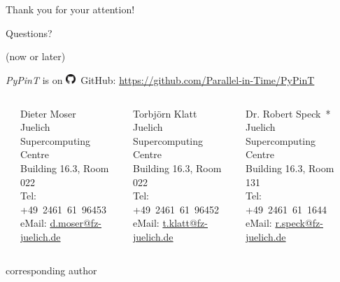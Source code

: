 \documentclass[%
  english,
  hyperref={pdfpagelabels=false},
  aspectratio=1610]{beamer}
\begin{document}
\begin{frame}
  \frametitle{~}
  \begin{center}
    {\huge Thank you for your attention!}\par
    \bigskip
    \bigskip
    \bigskip
    {\Large Questions?}\par
    {\scriptsize\color{fzjgray50}(now or later)}\par
    \bigskip
    {\scriptsize \emph{PyPinT} is on \includegraphics[height=1em]{src/GitHub-Mark-32px.png}~GitHub: \url{https://github.com/Parallel-in-Time/PyPinT}}
    \bigskip
    \begin{columns}
      \tiny
      \begin{column}{0.09\textwidth}
      \end{column}
      \begin{column}{0.3\textwidth}
        Dieter Moser\\
        Juelich Supercomputing Centre\\
        Building 16.3, Room 022\\
        Tel: +49~2461~61~96453\\
        eMail: \href{mailto:d.moser@fz-juelich.de}{d.moser@fz-juelich.de}
      \end{column}
      \begin{column}{0.3\textwidth}
        Torbjörn Klatt\\
        Juelich Supercomputing Centre\\
        Building 16.3, Room 022\\
        Tel: +49~2461~61~96452\\
        eMail: \href{mailto:t.klatt@fz-juelich.de}{t.klatt@fz-juelich.de}
      \end{column}
      \begin{column}{0.3\textwidth}
        Dr. Robert Speck~*\\
        Juelich Supercomputing Centre\\
        Building 16.3, Room 131\\
        Tel: +49~2461~61~1644\\
        eMail: \href{mailto:r.speck@fz-juelich.de}{r.speck@fz-juelich.de}
      \end{column}
      \begin{column}{0.01\textwidth}
      \end{column}
    \end{columns}
  \end{center}
  \vfill
  {\tiny * corresponding author}
\end{frame}
\end{document}
